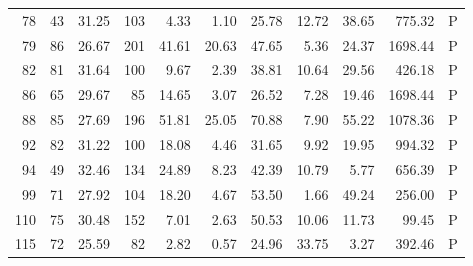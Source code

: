 \begin{table}[ht]
\begin{tabular}{rrrrrrrrrrl}
  78 &  43 & 31.25 & 103 & 4.33 & 1.10 & 25.78 & 12.72 & 38.65 & 775.32 & P \\ 
  79 &  86 & 26.67 & 201 & 41.61 & 20.63 & 47.65 & 5.36 & 24.37 & 1698.44 & P \\ 
  82 &  81 & 31.64 & 100 & 9.67 & 2.39 & 38.81 & 10.64 & 29.56 & 426.18 & P \\ 
  86 &  65 & 29.67 &  85 & 14.65 & 3.07 & 26.52 & 7.28 & 19.46 & 1698.44 & P \\ 
  88 &  85 & 27.69 & 196 & 51.81 & 25.05 & 70.88 & 7.90 & 55.22 & 1078.36 & P \\ 
  92 &  82 & 31.22 & 100 & 18.08 & 4.46 & 31.65 & 9.92 & 19.95 & 994.32 & P \\ 
  94 &  49 & 32.46 & 134 & 24.89 & 8.23 & 42.39 & 10.79 & 5.77 & 656.39 & P \\ 
  99 &  71 & 27.92 & 104 & 18.20 & 4.67 & 53.50 & 1.66 & 49.24 & 256.00 & P \\ 
  110 &  75 & 30.48 & 152 & 7.01 & 2.63 & 50.53 & 10.06 & 11.73 & 99.45 & P \\ 
  115 &  72 & 25.59 &  82 & 2.82 & 0.57 & 24.96 & 33.75 & 3.27 & 392.46 & P \\ 
   \hline
\end{tabular}
\end{table}
